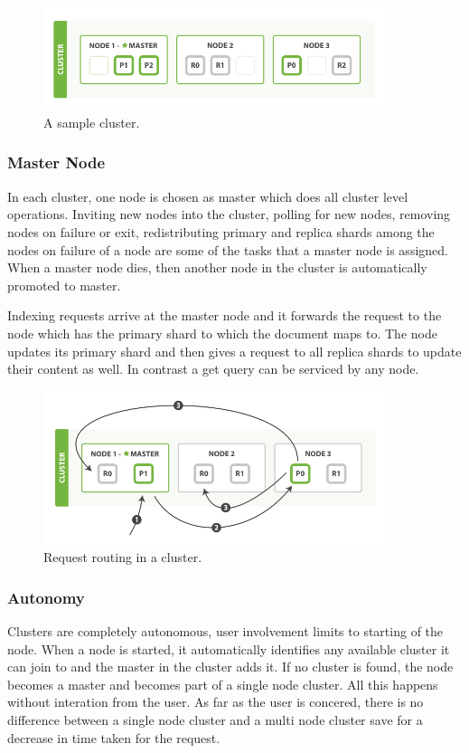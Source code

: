 \documentclass[12pt]{article}
\begin{document}
				\begin{figure}[ht]
					\centering\includegraphics[width=10cm]{images/cluster}
					\caption{A sample cluster.}
				\end{figure}

			\subsubsection{Master Node}
				In each cluster, one node is chosen as master which does all cluster level operations. Inviting new nodes into the cluster, polling for new nodes, removing nodes on failure or exit, redistributing primary and replica shards among the nodes on failure of a node are some of the tasks that a master node is assigned. When a master node dies, then another node in the cluster is automatically promoted to master.

				Indexing requests arrive at the master node and it forwards the request to the node which has the primary shard to which the document maps to. The node updates its primary shard and then gives a request to all replica shards to update their content as well. In contrast a get query can be serviced by any node.
				\begin{figure}[ht]
					\centering\includegraphics[width=10cm]{images/cluster_data}
					\caption{Request routing in a cluster.}
				\end{figure}

			\subsubsection{Autonomy}
				Clusters are completely autonomous, user involvement limits to starting of the node. When a node is started, it automatically identifies any available cluster it can join to and the master in the cluster adds it. If no cluster is found, the node becomes a master and becomes part of a single node cluster. All this happens without interation from the user. As far as the user is concered, there is no difference between a single node cluster and a multi node cluster save for a decrease in time taken for the request.
\end{document}
